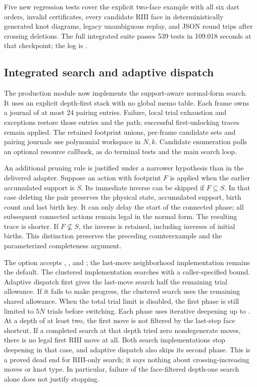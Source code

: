 Five new regression tests cover the explicit two-face example with all
six dart orders, invalid certificates, every candidate RIII face in
deterministically generated knot diagrams, legacy unambiguous replay, and
JSON round trips after crossing deletions.  The full integrated suite passes
539 tests in 109.018 seconds at that checkpoint; the log is
.

\subsection{Integrated search and adaptive dispatch}
The production module  now implements the
support-aware normal-form search.  It uses an explicit depth-first stack
with no global memo table.  Each frame owns a journal of at most 24 pairing
entries.  Failure, local trial exhaustion and exceptions restore those
entries and the path; successful first-unlocking traces remain applied.
The retained footprint unions, per-frame candidate sets and pairing journals
use polynomial workspace in $N,k$.  Candidate enumeration polls an optional
resource callback, as do terminal tests and the main search loop.

An additional pruning rule is justified under a narrower hypothesis than
in the delivered adapter.  Suppose an action with footprint $F$ is applied
when the earlier accumulated support is $S$.  Its immediate inverse can be
skipped if $F\subseteq S$.  In that case deleting the pair preserves the
physical state, accumulated support, birth count and last birth key.  It
can only delay the start of the connected phase; all subsequent connected
actions remain legal in the normal form.  The resulting trace is shorter.
If $F\not\subseteq S$, the inverse is retained, including inverses of
initial births.  This distinction preserves the preceding counterexample
and the parameterized completeness argument.

The  option accepts , , and
; the last-move neighborhood implementation remains the
default.  The clustered implementation searches with a caller-specified
 bound.  Adaptive dispatch first gives the last-move search
half the remaining trial allowance.  If it fails to make progress, the
clustered search uses the remaining shared allowance.  When the total trial
limit is disabled, the first phase is still limited to $5N$ trials before
switching.  Each phase uses iterative deepening up to .
At a depth of at least two, the first move is not filtered by the
last-step face shortcut.  If a completed search at that depth tried zero
nondegenerate moves, there is no legal first RIII move at all.  Both search
implementations stop deepening in that case, and adaptive dispatch also
skips its second phase.  This is a proved dead end for RIII-only search;
it says nothing about crossing-increasing moves or knot type.  In particular,
failure of the face-filtered depth-one search alone does not justify stopping.

